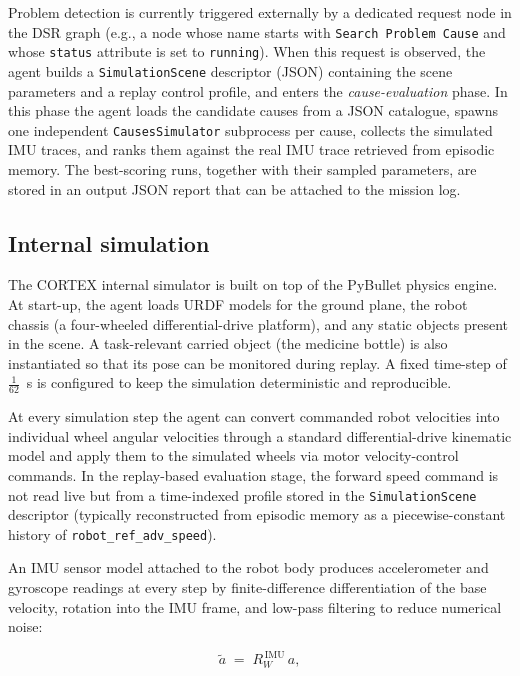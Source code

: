 \documentclass[a4paper, twoside]{article}
\begin{document}
Problem detection is currently triggered externally by a dedicated request node in the DSR graph (e.g., a node whose name starts with \texttt{Search Problem Cause} and whose \texttt{status} attribute is set to \texttt{running}).
When this request is observed, the agent builds a \texttt{SimulationScene} descriptor (JSON) containing the scene parameters and a replay control profile, and enters the \emph{cause-evaluation} phase.
In this phase the agent loads the candidate causes from a JSON catalogue, spawns one independent \texttt{CausesSimulator} subprocess per cause, collects the simulated IMU traces, and ranks them against the real IMU trace retrieved from episodic memory.
The best-scoring runs, together with their sampled parameters, are stored in an output JSON report that can be attached to the mission log.

\subsection{Internal simulation}

The CORTEX internal simulator is built on top of the PyBullet physics engine.
At start-up, the agent loads URDF models for the ground plane, the robot chassis (a four-wheeled differential-drive platform), and any static objects present in the scene.
A task-relevant carried object (the medicine bottle) is also instantiated so that its pose can be monitored during replay.
A fixed time-step of $\frac{1}{62}$~s is configured to keep the simulation deterministic and reproducible.

At every simulation step the agent can convert commanded robot velocities into individual wheel angular velocities through a standard differential-drive kinematic model and apply them to the simulated wheels via motor velocity-control commands.
In the replay-based evaluation stage, the forward speed command is not read live but from a time-indexed profile stored in the \texttt{SimulationScene} descriptor (typically reconstructed from episodic memory as a piecewise-constant history of \texttt{robot\_ref\_adv\_speed}).

An IMU sensor model attached to the robot body produces accelerometer and gyroscope readings at every step by finite-difference differentiation of the base velocity, rotation into the IMU frame, and low-pass filtering to reduce numerical noise:

\begin{equation}
    \tilde{a} \;=\; R_{W}^{\,\mathrm{IMU}}\, a,
\end{equation}
\end{document}
